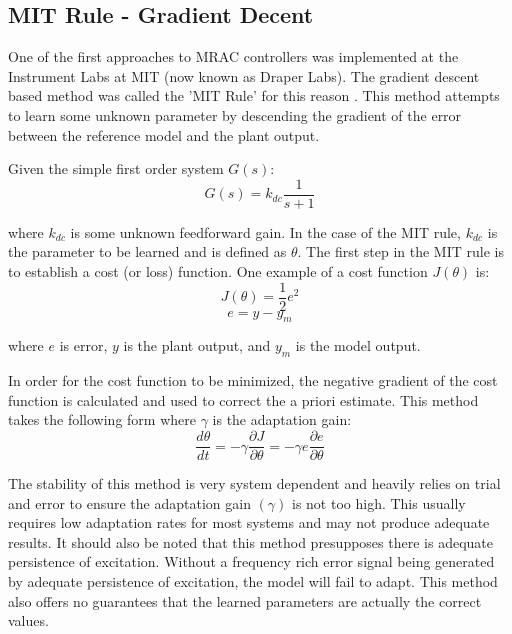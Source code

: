 \subsection{MIT Rule - Gradient Decent}
One of the first approaches to \ac{MRAC} controllers was implemented at the Instrument Labs at MIT (now known as Draper Labs).  The gradient descent based method was called the 'MIT Rule' for this reason \cite{aastrom2013adaptive}.  This method attempts to learn some unknown parameter by descending the gradient of the error between the reference model and the plant output.

Given the simple first order system $G(s)$:
\begin{equation}
G(s) = k_{dc}\frac{1}{s+1}
\end{equation}

where $k_{dc}$ is some unknown feedforward gain.  In the case of the MIT rule, $k_{dc}$ is the parameter to be learned and is defined as $\theta$.  The first step in the MIT rule is to establish a cost (or loss) function.  One example of a cost function $J(\theta)$ is:
\begin{equation}
J(\theta) = \frac{1}{2}e^2
\end{equation}
\begin{equation}
e=y-y_m
\end{equation}

where $e$ is error, $y$ is the plant output, and $y_m$ is the model output.

In order for the cost function to be minimized, the negative gradient of the cost function is calculated and used to correct the a priori estimate.  This method takes the following form where $\gamma$ is the adaptation gain:
\begin{equation}
\frac{d\theta}{dt}=-\gamma \frac{\partial{J}}{\partial{\theta}} =-\gamma e\frac{\partial{e}}{\partial{\theta}}
\end{equation}

The stability of this method is very system dependent and heavily relies on trial and error to ensure the adaptation gain $(\gamma)$ is not too high.  This usually requires low adaptation rates for most systems and may not produce adequate results.  It should also be noted that this method presupposes there is adequate persistence of excitation.  Without a frequency rich error signal being generated by adequate persistence of excitation, the model will fail to adapt.  This method also offers no guarantees that the learned parameters are actually the correct values.

